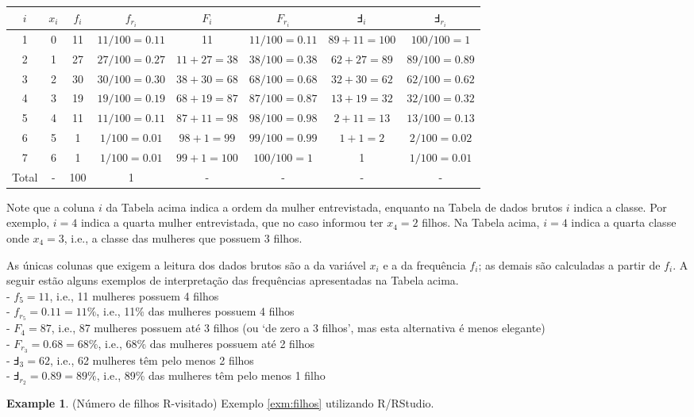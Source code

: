 \documentclass[
]{book}
\theoremstyle{definition}
\theoremstyle{definition}
\newtheorem{example}{Example}[chapter]
\theoremstyle{definition}
\theoremstyle{remark}
\begin{document}
\begin{longtable}[]{@{}cccccccc@{}}
\toprule
\(i\) & \(x_{i}\) & \(f_{i}\) & \(f_{r_{i}}\) & \(F_{i}\) & \(F_{r_{i}}\) & \(\Finv_{i}\) & \(\Finv_{r_{i}}\)\tabularnewline
\midrule
\endhead
1 & 0 & 11 & \(11/100=0.11\) & 11 & \(11/100=0.11\) & \(89+11=100\) & \(100/100=1\)\tabularnewline
2 & 1 & 27 & \(27/100=0.27\) & \(11+27=38\) & \(38/100=0.38\) & \(62+27=89\) & \(89/100=0.89\)\tabularnewline
3 & 2 & 30 & \(30/100=0.30\) & \(38+30=68\) & \(68/100=0.68\) & \(32+30=62\) & \(62/100=0.62\)\tabularnewline
4 & 3 & 19 & \(19/100=0.19\) & \(68+19=87\) & \(87/100=0.87\) & \(13+19=32\) & \(32/100=0.32\)\tabularnewline
5 & 4 & 11 & \(11/100=0.11\) & \(87+11=98\) & \(98/100=0.98\) & \(2+11=13\) & \(13/100=0.13\)\tabularnewline
6 & 5 & 1 & \(1/100=0.01\) & \(98+1=99\) & \(99/100=0.99\) & \(1+1=2\) & \(2/100=0.02\)\tabularnewline
7 & 6 & 1 & \(1/100=0.01\) & \(99+1=100\) & \(100/100=1\) & 1 & \(1/100=0.01\)\tabularnewline
Total & - & 100 & 1 & - & - & - & -\tabularnewline
\bottomrule
\end{longtable}

Note que a coluna \(i\) da Tabela acima indica a ordem da mulher entrevistada, enquanto na Tabela de dados brutos \(i\) indica a classe. Por exemplo, \(i=4\) indica a quarta mulher entrevistada, que no caso informou ter \(x_{4}=2\) filhos. Na Tabela acima, \(i=4\) indica a quarta classe onde \(x_{4}=3\), i.e., a classe das mulheres que possuem 3 filhos.

As únicas colunas que exigem a leitura dos dados brutos são a da variável \(x_i\) e a da frequência \(f_i\); as demais são calculadas a partir de \(f_i\). A seguir estão alguns exemplos de interpretação das frequências apresentadas na Tabela acima.\\
- \(f_{5}=11\), i.e., 11 mulheres possuem 4 filhos\\
- \(f_{r_{5}}=0.11=11\%\), i.e., 11\% das mulheres possuem 4 filhos\\
- \(F_{4}=87\), i.e., 87 mulheres possuem até 3 filhos (ou `de zero a 3 filhos', mas esta alternativa é menos elegante)\\
- \(F_{r_{3}}=0.68=68\%\), i.e., 68\% das mulheres possuem até 2 filhos\\
- \(\Finv_{3}=62\), i.e., 62 mulheres têm pelo menos 2 filhos\\
- \(\Finv_{r_{2}}=0.89=89\%\), i.e., 89\% das mulheres têm pelo menos 1 filho

\begin{example}
\protect\hypertarget{exm:filhos-r}{}{\label{exm:filhos-r} }(Número de filhos R-visitado) Exemplo \ref{exm:filhos} utilizando R/RStudio.
\end{example}
\end{document}
